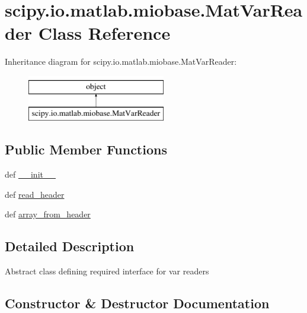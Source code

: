 \hypertarget{classscipy_1_1io_1_1matlab_1_1miobase_1_1MatVarReader}{}\section{scipy.\+io.\+matlab.\+miobase.\+Mat\+Var\+Reader Class Reference}
\label{classscipy_1_1io_1_1matlab_1_1miobase_1_1MatVarReader}
Inheritance diagram for scipy.\+io.\+matlab.\+miobase.\+Mat\+Var\+Reader\+:\begin{figure}[H]
\begin{center}
\leavevmode
\includegraphics[height=2.000000cm]{classscipy_1_1io_1_1matlab_1_1miobase_1_1MatVarReader}
\end{center}
\end{figure}
\subsection*{Public Member Functions}
\begin{DoxyCompactItemize}
\item 
def \hyperlink{classscipy_1_1io_1_1matlab_1_1miobase_1_1MatVarReader_a487b7fe5d95946f60c0c9a586dd5879f}{\+\_\+\+\_\+init\+\_\+\+\_\+}
\item 
def \hyperlink{classscipy_1_1io_1_1matlab_1_1miobase_1_1MatVarReader_af286e5b67ee77bbe6a6a67f971b15367}{read\+\_\+header}
\item 
def \hyperlink{classscipy_1_1io_1_1matlab_1_1miobase_1_1MatVarReader_ad28c266a28b4601b785e74f898f7ff00}{array\+\_\+from\+\_\+header}
\end{DoxyCompactItemize}


\subsection{Detailed Description}
\begin{DoxyVerb}Abstract class defining required interface for var readers\end{DoxyVerb}
 

\subsection{Constructor \& Destructor Documentation}
\hypertarget{classscipy_1_1io_1_1matlab_1_1miobase_1_1MatVarReader_a487b7fe5d95946f60c0c9a586dd5879f}{}
